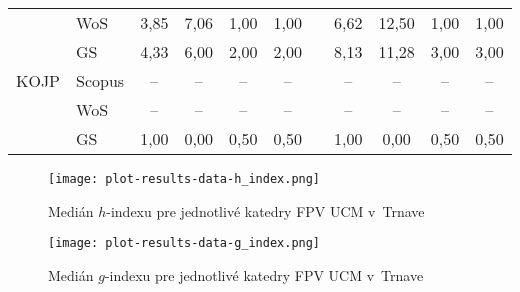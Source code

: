 \begin{table}
\begin{tabularx}{\textwidth}{Xlcccclcccc}
         & WoS    & 3,85  & 7,06  & 1,00  & 1,00  & & 6,62  & 12,50 & 1,00  & 1,00  \\
         & GS     & 4,33  & 6,00  & 2,00  & 2,00  & & 8,13  & 11,28 & 3,00  & 3,00  \\[1ex]
    KOJP & Scopus & --    & --    & --    & --    & & --    & --    & --    & --    \\
         & WoS    & --    & --    & --    & --    & & --    & --    & --    & --    \\
         & GS     & 1,00  & 0,00  & 0,50  & 0,50  & & 1,00  & 0,00  & 0,50  & 0,50  \\
    \bottomrule
  \end{tabularx}
\end{table}

\begin{figure}
  \centering
  \texttt{[image: plot-results-data-h\_index.png]}
  \caption{Medián $h$-indexu pre jednotlivé katedry FPV UCM v~Trnave}
  \label{fig:h-index.plot}
\end{figure}

\begin{figure}
  \centering
  \texttt{[image: plot-results-data-g\_index.png]}
  \caption{Medián $g$-indexu pre jednotlivé katedry FPV UCM v~Trnave}
  \label{fig:g-index.plot}
\end{figure}

